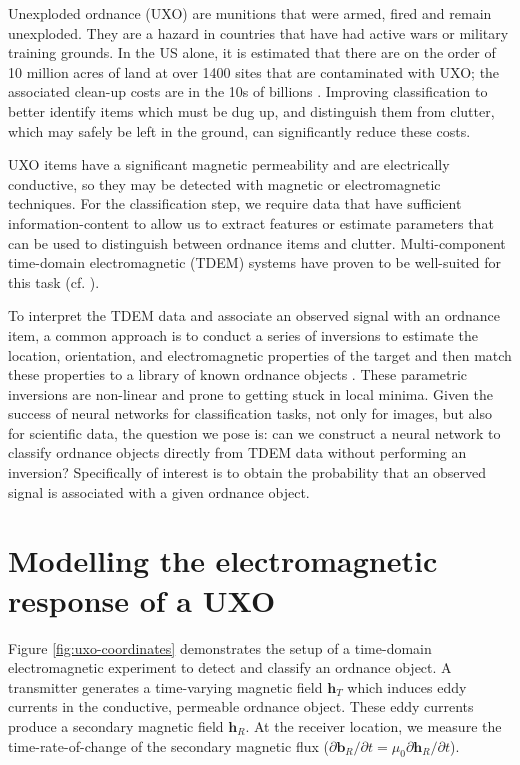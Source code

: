 \documentclass{segabs}
\begin{document}
Unexploded ordnance (UXO) are munitions that were armed, fired and remain unexploded. They are a hazard in countries that have had active wars or military training grounds. In the US alone, it is estimated that there are on the order of 10 million acres of land at over 1400 sites that are contaminated with UXO; the associated clean-up costs are in the 10s of billions \citep{Etter2003}. Improving classification to better identify items  which must be dug up, and distinguish them from clutter, which may safely be left in the ground, can significantly reduce these costs.

UXO items have a significant magnetic permeability and are electrically conductive, so they may be detected with magnetic or electromagnetic techniques. For the classification step, we require data that have sufficient information-content to allow us to extract features or estimate parameters that can be used to distinguish between ordnance items and clutter. Multi-component time-domain electromagnetic (TDEM) systems have proven to be well-suited for this task (cf. \cite{Bell2001, Pasion2001, Zhang2003, Billings2010}).

To interpret the TDEM data and associate an observed signal with an ordnance item, a common approach is to conduct a series of inversions to estimate the location, orientation, and electromagnetic properties of the target and then match these properties to a library of known ordnance objects \cite{Andrews2011, Beran2013}. These parametric inversions are non-linear and prone to getting stuck in local minima. Given the success of neural networks for classification tasks, not only for images, but also for scientific data, the question we pose is: can we construct a neural network to classify ordnance objects directly from TDEM data without performing an inversion? Specifically of interest is to obtain the probability that an observed signal is associated with a given ordnance object.

\section{Modelling the electromagnetic response of a UXO}

Figure \ref{fig:uxo-coordinates} demonstrates the setup of a time-domain electromagnetic experiment to detect and classify an ordnance object. A transmitter generates a time-varying magnetic field $\mathbf{h}_T$ which induces eddy currents in the conductive, permeable ordnance object. These eddy currents produce a secondary magnetic field $\mathbf{h}_R$. At the receiver location, we measure the time-rate-of-change of the secondary magnetic flux ($\partial \mathbf{b}_R/\partial t = \mu_0 \partial \mathbf{h}_R/\partial t$).
\end{document}
